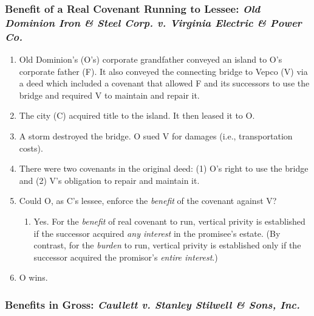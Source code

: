 \subsubsection{Benefit of a Real Covenant Running to Lessee: \emph{Old 
Dominion Iron \& Steel Corp. v. Virginia Electric \& Power Co.}}

\begin{enumerate}
    \item Old Dominion's (O's) corporate grandfather conveyed an island to O's 
    corporate father (F). It also conveyed the connecting bridge to Vepco (V) 
    via a deed which included a covenant that allowed F and its successors to 
    use the bridge and required V to maintain and repair it.
    \item The city (C) acquired title to the island. It then leased it to O.
    \item A storm destroyed the bridge. O sued V for damages (i.e., 
    transportation costs).
    \item There were two covenants in the original deed: (1) O's right to use 
    the bridge and (2) V's obligation to repair and maintain it.
    \item Could O, as C's lessee, enforce the \emph{benefit} of the covenant 
    against V?
    \begin{enumerate}
        \item Yes. For the \emph{benefit} of real covenant to run, vertical 
        privity is established if the successor acquired \emph{any interest} 
        in the promisee's estate. (By contrast, for the \emph{burden} to run, 
        vertical privity is established only if the successor acquired the 
        promisor's \emph{entire interest}.)
    \end{enumerate}
    \item O wins.
\end{enumerate}

\subsubsection{Benefits in Gross: \emph{Caullett v. Stanley Stilwell \& Sons, 
Inc.}}

